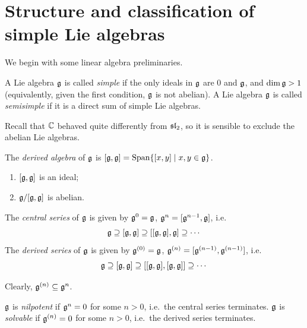\section{Structure and classification of simple Lie algebras}

 We begin with some linear algebra preliminaries.

\begin{definition}
A Lie algebra $\g$ is called \emph{simple} if the only ideals in $\g$ are $0$
and $\g$, and $\dim \g > 1$ (equivalently, given the first condition, $\g$ is
not abelian). A Lie algebra $\g$ is called \emph{semisimple} if it is a direct
sum of simple Lie algebras.
\end{definition}

\begin{remark}
Recall that $\C$ behaved quite differently from $\sl_2$, so it is sensible to
exclude the abelian Lie algebras.
\end{remark}

\begin{definition}
The \emph{derived algebra} of $\g$ is
$[\g, \g] = \Span\setc{[x, y]}{x, y \in \g}$.
\end{definition}

\begin{exercise}\leavevmode
\begin{enumerate}
  \item $[\g, \g]$ is an ideal;
  \item $\g/[\g, \g]$ is abelian.
\end{enumerate}
\end{exercise}

\begin{definition}
The \emph{central series} of $\g$ is given by $\g^0 = \g$,
$\g^n = [\g^{n-1}, \g]$, i.e.
\[
  \g \supseteq [\g, \g] \supseteq [[\g, \g], \g] \supseteq \cdots
\]
The \emph{derived series} of $\g$ is given by $\g^{(0)} = \g$,
$\g^{(n)} = [\g^{(n-1)}, \g^{(n-1)}]$, i.e.
\[
  \g \supseteq [\g, \g] \supseteq [[\g, \g], [\g, \g]] \supseteq \cdots
\]
\end{definition}

\begin{remark}
Clearly, $\g^{(n)} \subseteq \g^n$.
\end{remark}

\begin{definition}
$\g$ is \emph{nilpotent} if $\g^n = 0$ for some $n > 0$, i.e.\ the central
series terminates. $\g$ is \emph{solvable} if $\g^{(n)} = 0$ for some $n > 0$,
i.e.\ the derived series terminates.
\end{definition}


